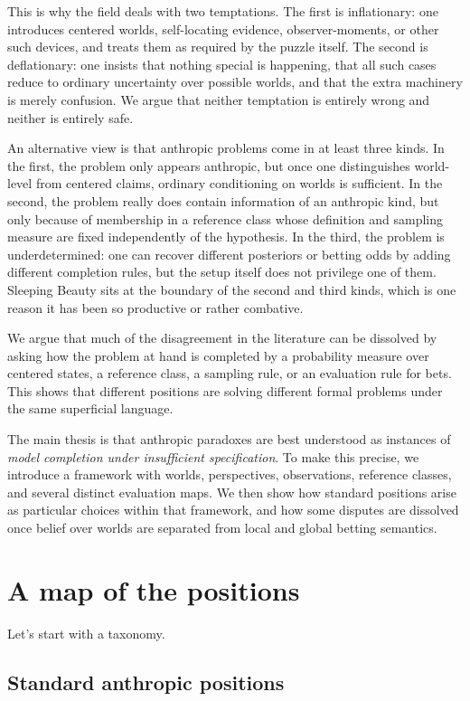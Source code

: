 \documentclass[11pt]{article}
\newcommand{\1}{\mathbf{1}}
\begin{document}
This is why the field deals with two temptations. 
The first is inflationary: one introduces centered worlds, self-locating evidence, observer-moments, or other such devices, and treats them as required by the puzzle itself. 
The second is deflationary: one insists that nothing special is happening, that all such cases reduce to ordinary uncertainty over possible worlds, and that the extra machinery is merely confusion. 
We argue that neither temptation is entirely wrong and neither is entirely safe.

An alternative view is that anthropic problems come in at least three kinds. 
In the first, the problem only appears anthropic, but once one distinguishes world-level from centered claims, ordinary conditioning on worlds is sufficient. 
In the second, the problem really does contain information of an anthropic kind, but only because of membership in a reference class whose definition and sampling measure are fixed independently of the hypothesis. 
In the third, the problem is underdetermined: one can recover different posteriors or betting odds by adding different completion rules, but the setup itself does not privilege one of them. 
Sleeping Beauty sits at the boundary of the second and third kinds, which is one reason it has been so productive or rather combative.

We argue that much of the disagreement in the literature can be dissolved by asking how the problem at hand is completed by a probability measure over centered states, a reference class, a sampling rule, or an evaluation rule for bets. 
This shows that different positions are solving different formal problems under the same superficial language. 

The main thesis is that anthropic paradoxes are best understood as instances of \emph{model completion under insufficient specification}. 
To make this precise, we introduce a framework with worlds, perspectives, observations, reference classes, and several distinct evaluation maps. 
We then show how standard positions arise as particular choices within that framework, and how some disputes are dissolved once belief over worlds are separated from local and global betting semantics.

\section{A map of the positions}

Let's start with a taxonomy. 

\subsection{Standard anthropic positions}
\end{document}
